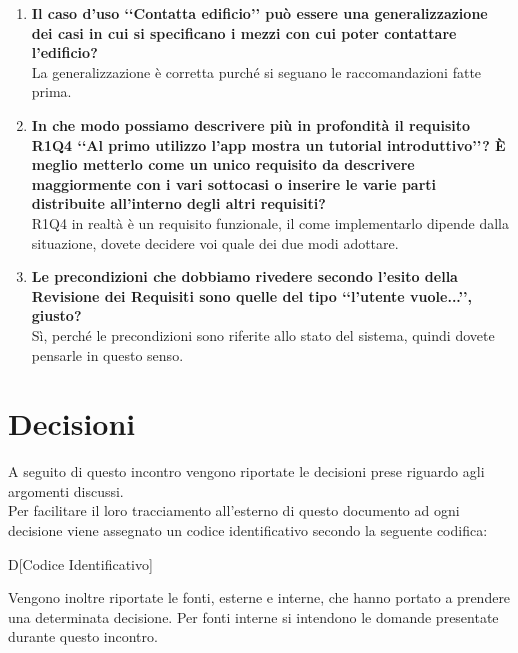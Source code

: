 \documentclass[a4paper,titlepage]{article}
\begin{document}
\begin{enumerate}
	\item \textbf{Il caso d'uso ‘‘Contatta edificio’’ può essere una generalizzazione dei casi in cui si specificano i mezzi con cui poter contattare l'edificio?} \\
	La generalizzazione è corretta purché si seguano le raccomandazioni fatte prima.
	\item \textbf{In che modo possiamo descrivere più in profondità il requisito R1Q4 ‘‘Al primo utilizzo l'app mostra un tutorial introduttivo’’? È meglio metterlo come un unico requisito da descrivere maggiormente con i vari sottocasi o inserire le varie parti distribuite all'interno degli altri requisiti?} \\
	R1Q4 in realtà è un requisito funzionale, il come implementarlo dipende dalla situazione, dovete decidere voi quale dei due modi adottare.
	\item \textbf{Le precondizioni che dobbiamo rivedere secondo l'esito della Revisione dei Requisiti sono quelle del tipo ‘‘l'utente vuole...’’, giusto?}	\\
	Sì, perché le precondizioni sono riferite allo stato del sistema, quindi dovete pensarle in questo senso.
\end{enumerate}

\section{Decisioni}
A seguito di questo incontro vengono riportate le decisioni prese riguardo agli argomenti discussi. \\
Per facilitare il loro tracciamento all'esterno di questo documento ad ogni decisione viene assegnato un codice identificativo secondo la seguente codifica:
\begin{center}
D[Codice Identificativo]
\end{center}
Vengono inoltre riportate le fonti, esterne e interne, che hanno portato a prendere una determinata decisione. Per fonti interne si intendono le domande presentate durante questo incontro.
\end{document}
